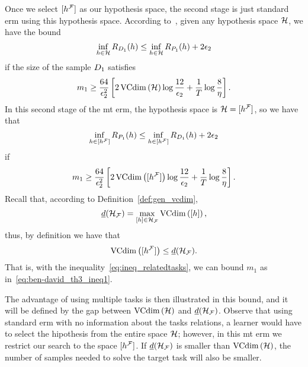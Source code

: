 Once we select $\lbrack h^{\mathcal{F}}\rbrack$ as our hypothesis space, the second stage is just standard \acrshort{erm} using this hypothesis space.
%
According to~\cite{vapnik1982estimation}, given any hypothesis space $\mathcal{H}$, we have the bound
\begin{equation}\nonumber
    \inf_{h \in \mathcal{H}} R_{D_1}(h) \leq \inf_{h \in \mathcal{H}} R_{P_1}(h) + 2 \epsilon_2
\end{equation}
if the size of the sample $D_1$ satisfies
\begin{equation}
    \nonumber
    m_1 \geq  \frac{64}{\epsilon_2^2} \left[2 \operatorname{VCdim}\left(\mathcal{H}\right) \log \frac{12}{\epsilon_2} + \frac{1}{T}\log\frac{8}{\eta} \right] .
\end{equation}
In this second stage of the \acrshort{mt} \acrshort{erm}, the hypothesis space is $\mathcal{H} = \lbrack h^{\mathcal{F}}\rbrack$, so we have that 
\begin{equation}\nonumber
    \inf_{h \in \lbrack h^{\mathcal{F}}\rbrack} R_{P_1}(h) \leq \inf_{h \in \lbrack h^{\mathcal{F}}\rbrack} R_{D_1}(h) +  2 \epsilon_2
\end{equation}
if
\begin{equation}
    \nonumber
    m_1 \geq  \frac{64}{\epsilon_2^2} \left[2 \operatorname{VCdim}\left(\lbrack h^{\mathcal{F}}\rbrack\right) \log \frac{12}{\epsilon_2} + \frac{1}{T}\log\frac{8}{\eta} \right] .
\end{equation}
%
Recall that, according to Definition~\ref{def:gen_vcdim}, 
$$ \underline{d}(\mathcal{H}_{\mathcal{F}}) = \max_{\lbrack h\rbrack \in \mathcal{H}_{\mathcal{F}}} \operatorname{VCdim}\left(\lbrack h\rbrack\right), $$
thus, by definition we have that
\begin{equation}
    \label{eq:ineq_relatedtasks}
    \vcdim{\equivclass{\hypf^\frelset}} \leq \underline{d}(\hypspace_\frelset) .
\end{equation}
That is, with the inequality~\eqref{eq:ineq_relatedtasks}, we can bound $m_1$ as in~\eqref{eq:ben-david_th3_ineq1}.
%

The advantage of using multiple tasks is then illustrated in this bound, and it will be defined by the gap between $\operatorname{VCdim}\left(\mathcal{H}\right)$ and $\underline{d}(\mathcal{H}_{\mathcal{F}})$. 
Observe that using standard \acrshort{erm} with no information about the tasks relations, a learner would have to select the hipothesis from the entire space $\mathcal{H}$; however, in this \acrshort{mt} \acrshort{erm} we restrict our search to the space $\lbrack h^{\mathcal{F}}\rbrack$.
If $\underline{d}(\mathcal{H}_{\mathcal{F}})$ is smaller than $\operatorname{VCdim}\left(\mathcal{H}\right)$, the number of samples needed to solve the target task will also be smaller.

